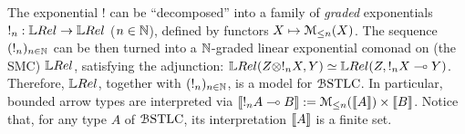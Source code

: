 \begin{remark}\label{rmk:ModelsOfBSTLC}
The exponential $!$ can be ``decomposed'' into a family of \emph{graded} exponentials $!_n:\LREL\to\LREL$ ($n\in\mathbb{N}$), defined by functors $X\mapsto \mathcal{M}_{\leq n}(X)$. %
The sequence $(!_n)_{n\in\mathbb{N}}$ can be then turned into a $\mathbb{N}$-graded linear exponential comonad on (the SMC) $\LREL$, satisfying the adjunction:
$\LREL(Z\otimes !_{n}X,Y) \simeq \LREL(Z, !_{n}X\multimap Y)$.
Therefore, $\LREL$, together with $(!_n)_{n\in\mathbb{N}}$, is a model for $\mathcal{B}\mathrm{STLC}$. 
In particular, bounded arrow types are interpreted via
$\llbracket!_{n}A\multimap B\rrbracket:= \mathcal{M}_{\leq n}(\llbracket A\rrbracket) \times \llbracket B\rrbracket$.
Notice that, for any type $A$ of $\mathcal{B}\mathrm{STLC}$, its interpretation $\llbracket A\rrbracket$ is a finite set.
\end{remark}



